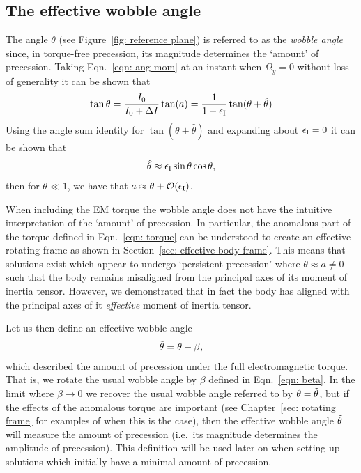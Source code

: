 \documentclass[../full_thesis/full_thesis.tex]{subfiles}
\begin{document}
\subsection{The effective wobble angle}
\label{sec: wobble angle}
The angle $\theta$ (see Figure~\ref{fig: reference plane}) is referred to as the
\emph{wobble angle} since, in torque-free precession, its magnitude determines
the `amount' of precession. Taking Eqn.~\eqref{eqn: ang mom} at an instant when
$\Omega_y=0$ without loss of generality it can be shown that
\begin{align}
\tan\theta  = \frac{I_0}{I_0 + \Delta I} \tan(a) = \frac{1}{1+\epsilon_{\mathrm{I}}}\tan(\theta + \hat\theta)
\end{align}
Using the angle sum identity for $\tan(\theta + \hat{\theta})$ and expanding
about $\epsilon_{\mathrm{I}}=0$ it can be shown \citep{Jones2001} that
\begin{align}
\hat{\theta} \approx \epsilon_{\mathrm{I}}\sin\theta\cos\theta,
\label{eqn: theta hat theta}
\end{align}
then for $\theta \ll 1$, we have that $a\approx \theta + \mathcal{O}(\epsilon_{\mathrm{I}})$.

When including the EM torque the wobble angle
does not have the intuitive interpretation of the `amount' of precession.  In
particular, the anomalous part of the torque defined in Eqn.~\eqref{eqn: torque}
can be understood to create an effective rotating frame as shown in Section~\ref{sec:
effective body frame}. This means that solutions exist which appear to undergo
`persistent precession' where $\theta \approx a\ne0$ such that the body remains
misaligned from the principal axes of its moment of inertia tensor. However, we
demonstrated that in fact the body has aligned with the principal axes of
it \emph{effective} moment of inertia tensor.

Let us then define an effective wobble angle
\begin{align}
\tilde{\theta} = \theta - \beta,
\label{eqn: effective wobble angle}
\end{align}
which described the amount of precession under the full electromagnetic torque.
That is, we rotate the usual wobble angle by $\beta$ defined in
Eqn.~\eqref{eqn: beta}. In the limit where $\beta \rightarrow 0$ we recover the
usual wobble angle referred to by \citet{Jones2001} $\theta = \tilde{\theta}$,
but if the effects of the anomalous torque are important (see Chapter~\ref{sec:
rotating frame} for examples of when this is the case), then the effective wobble
angle $\tilde{\theta}$ will measure the amount of precession (i.e.\ its magnitude
determines the amplitude of precession). This definition will be used later on
when setting up solutions which initially have a minimal amount of precession.
\end{document}
